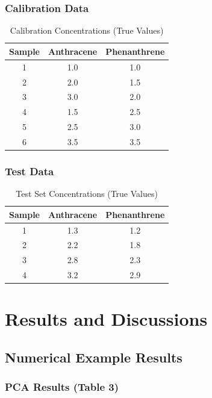 \documentclass[12pt,a4paper]{article}
\begin{document}
\subsubsection{Calibration Data}

\begin{table}[H]
\centering
\caption{Calibration Concentrations (True Values)}
\begin{tabular}{ccc}
\toprule
Sample & Anthracene & Phenanthrene \\
\midrule
1 & 1.0 & 1.0 \\
2 & 2.0 & 1.5 \\
3 & 3.0 & 2.0 \\
4 & 1.5 & 2.5 \\
5 & 2.5 & 3.0 \\
6 & 3.5 & 3.5 \\
\bottomrule
\end{tabular}
\end{table}

\subsubsection{Test Data}

\begin{table}[H]
\centering
\caption{Test Set Concentrations (True Values)}
\begin{tabular}{ccc}
\toprule
Sample & Anthracene & Phenanthrene \\
\midrule
1 & 1.3 & 1.2 \\
2 & 2.2 & 1.8 \\
3 & 2.8 & 2.3 \\
4 & 3.2 & 2.9 \\
\bottomrule
\end{tabular}
\end{table}

\newpage

\section{Results and Discussions}

\subsection{Numerical Example Results}

\subsubsection{PCA Results (Table 3)}
\end{document}
